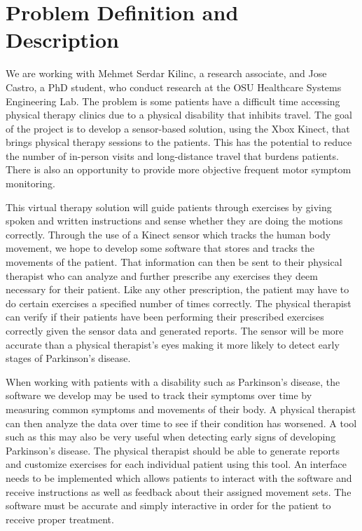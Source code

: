\documentclass[onecolumn, draftclsnofoot,10pt, compsoc]{IEEEtran}
\begin{document}
\section{Problem Definition and Description}
    We are working with Mehmet Serdar Kilinc, a research associate, and Jose Castro, a PhD student, who conduct research at the OSU Healthcare Systems Engineering Lab. The problem is some patients have a difficult time accessing physical therapy clinics due to a physical disability that inhibits travel. The goal of the project is to develop a sensor-based solution, using the Xbox Kinect, that brings physical therapy sessions to the patients. This has the potential to reduce the number of in-person visits and long-distance travel that burdens patients. There is also an opportunity to provide more objective frequent motor symptom monitoring.\par

    This virtual therapy solution will guide patients through exercises by giving spoken and written instructions and sense whether they are doing the motions correctly. Through the use of a Kinect sensor which tracks the human body movement, we hope to develop some software that stores and tracks the movements of the patient. That information can then be sent to their physical therapist who can analyze and further prescribe any exercises they deem necessary for their patient. Like any other prescription, the patient may have to do certain exercises a specified number of times correctly. The physical therapist can verify if their patients have been performing their prescribed exercises correctly given the sensor data and generated reports. The sensor will be more accurate than a physical therapist's eyes making it more likely to detect early stages of Parkinson's disease.\par

    When working with patients with a disability such as Parkinson's disease, the software we develop may be used to track their symptoms over time by measuring common symptoms and movements of their body. A physical therapist can then analyze the data over time to see if their condition has worsened. A tool such as this may also be very useful when detecting early signs of developing Parkinson's disease. The physical therapist should be able to generate reports and customize exercises for each individual patient using this tool. An interface needs to be implemented which allows patients to interact with the software and receive instructions as well as feedback about their assigned movement sets. The software must be accurate and simply interactive in order for the patient to receive proper treatment.  
\end{document}
